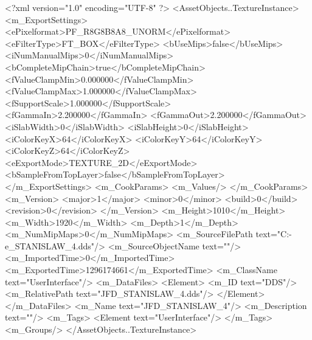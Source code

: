 <?xml version="1.0" encoding="UTF-8" ?>
<AssetObjects..TextureInstance>
	<m_ExportSettings>
		<ePixelformat>PF_R8G8B8A8_UNORM</ePixelformat>
		<eFilterType>FT_BOX</eFilterType>
		<bUseMips>false</bUseMips>
		<iNumManualMips>0</iNumManualMips>
		<bCompleteMipChain>true</bCompleteMipChain>
		<fValueClampMin>0.000000</fValueClampMin>
		<fValueClampMax>1.000000</fValueClampMax>
		<fSupportScale>1.000000</fSupportScale>
		<fGammaIn>2.200000</fGammaIn>
		<fGammaOut>2.200000</fGammaOut>
		<iSlabWidth>0</iSlabWidth>
		<iSlabHeight>0</iSlabHeight>
		<iColorKeyX>64</iColorKeyX>
		<iColorKeyY>64</iColorKeyY>
		<iColorKeyZ>64</iColorKeyZ>
		<eExportMode>TEXTURE_2D</eExportMode>
		<bSampleFromTopLayer>false</bSampleFromTopLayer>
	</m_ExportSettings>
	<m_CookParams>
		<m_Values/>
	</m_CookParams>
	<m_Version>
		<major>1</major>
		<minor>0</minor>
		<build>0</build>
		<revision>0</revision>
	</m_Version>
	<m_Height>1010</m_Height>
	<m_Width>1920</m_Width>
	<m_Depth>1</m_Depth>
	<m_NumMipMaps>0</m_NumMipMaps>
	<m_SourceFilePath text="C:\Users\Deo-e\Desktop\JFD_STANISLAW_4.dds"/>
	<m_SourceObjectName text=""/>
	<m_ImportedTime>0</m_ImportedTime>
	<m_ExportedTime>1296174661</m_ExportedTime>
	<m_ClassName text="UserInterface"/>
	<m_DataFiles>
		<Element>
			<m_ID text="DDS"/>
			<m_RelativePath text="JFD_STANISLAW_4.dds"/>
		</Element>
	</m_DataFiles>
	<m_Name text="JFD_STANISLAW_4"/>
	<m_Description text=""/>
	<m_Tags>
		<Element text="UserInterface"/>
	</m_Tags>
	<m_Groups/>
</AssetObjects..TextureInstance>

